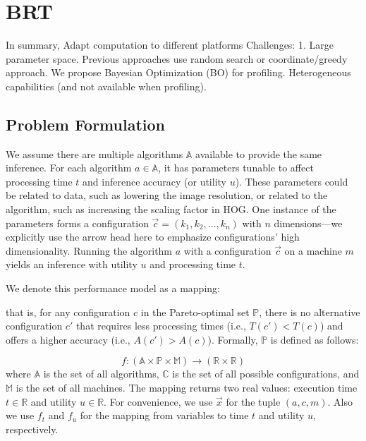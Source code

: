 \section{BRT}

In summary, Adapt computation to different platforms Challenges: 1. Large
parameter space. Previous approaches use random search or coordinate/greedy
approach. We propose Bayesian Optimization (BO) for profiling. Heterogeneous
capabilities (and not available when profiling).

\subsection{Problem Formulation}
\label{sec:problem-formulation}

We assume there are multiple algorithms $\mathbb{A}$ available to provide the
same inference. For each algorithm $a \in \mathbb{A}$, it has parameters tunable
to affect processing time $t$ and inference accuracy (or utility $u$). These
parameters could be related to data, such as lowering the image resolution, or
related to the algorithm, such as increasing the scaling factor in HOG. One
instance of the parameters forms a configuration
$\vec{c} = (k_1, k_2, \dots, k_n)$ with $n$ dimensions---we explicitly use the
arrow head here to emphasize configurations' high dimensionality. Running the
algorithm $a$ with a configuration $\vec{c}$ on a machine $m$ yields an
inference with utility $u$ and processing time $t$.

We denote this performance model as a mapping:

that is, for any configuration $c$ in the Pareto-optimal set $\mathbb{P}$, there
is no alternative configuration $c'$ that requires less processing times (i.e.,
$T(c') < T(c)$) and offers a higher accuracy (i.e., $A(c') > A(c)$). Formally,
$\mathbb{P}$ is defined as follows:

{\small \vspace{-1em}
  \begin{equation*}
    f: (\mathbb{A} \times \mathbb{P} \times \mathbb{M}) \rightarrow
    (\mathbb{R}\times \mathbb{R})
\end{equation*}
} where $\mathbb{A}$ is the set of all algorithms, $\mathbb{C}$ is the set of
all possible configurations, and $\mathbb{M}$ is the set of all machines. The
mapping returns two real values: execution time $t \in \mathbb{R}$ and utility
$u \in \mathbb{R}$. For convenience, we use $\vec{x}$ for the tuple $(a, c, m)$.
Also we use $f_t$ and $f_u$ for the mapping from variables to time $t$ and
utility $u$, respectively.

